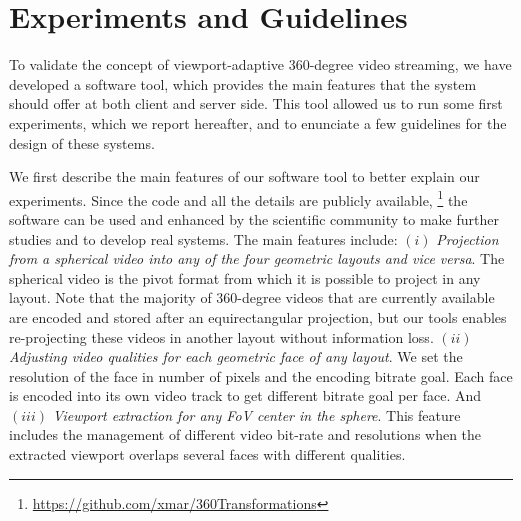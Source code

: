 \section{Experiments and Guidelines}
\label{sec:evaluation}

To validate the concept of viewport-adaptive 360-degree video streaming, we have developed
a software tool, which provides the main features that the system should offer at both client and 
server side. This tool allowed us to run some first experiments, which we report hereafter, and to
enunciate a few guidelines for the design of these systems.

We first describe the main features of our software tool to better explain our experiments.
Since the code and all the details are publicly available,%
\footnote{\url{https://github.com/xmar/360Transformations}} the software can be used and enhanced
by the scientific community to make further studies and to develop real systems. The main
features include: $(i)$ \emph{Projection from a spherical video into any of the four
geometric layouts and vice versa}. The spherical video is the pivot format from which it
is possible to project in any layout.
Note that the majority of 360-degree videos that are currently available are encoded and stored after
an equirectangular projection, but our tools enables re-projecting these videos
in another layout without information loss. $(ii)$ \emph{Adjusting video qualities for each 
geometric face of any
layout}. We set the resolution of the face in number of
pixels and the encoding bitrate goal. Each face is encoded into its own video
track to get different
bitrate goal per face. And $(iii)$ \emph{Viewport extraction for any \ac{FoV} center in the
sphere}. This feature includes the management of different video bit-rate and resolutions
when the extracted viewport overlaps several faces with different qualities.

